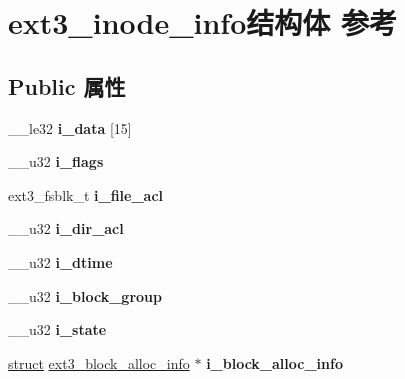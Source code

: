 \hypertarget{structext3__inode__info}{}\section{ext3\+\_\+inode\+\_\+info结构体 参考}
\label{structext3__inode__info}
\subsection*{Public 属性}
\begin{DoxyCompactItemize}
\item 
\mbox{\label{structext3__inode__info_a874b2de262f88993a49367ce4b3f1a1d}} 
\+\_\+\+\_\+le32 {\bfseries i\+\_\+data} \mbox{[}15\mbox{]}
\item 
\mbox{\label{structext3__inode__info_a2373d01f1f3c9dbc4b8bfe3b1b906a39}} 
\+\_\+\+\_\+u32 {\bfseries i\+\_\+flags}
\item 
\mbox{\label{structext3__inode__info_a9a3aec7576ca56da7dd3849a01e5adb4}} 
ext3\+\_\+fsblk\+\_\+t {\bfseries i\+\_\+file\+\_\+acl}
\item 
\mbox{\label{structext3__inode__info_a0224d4275a2f62814abf834895e5c775}} 
\+\_\+\+\_\+u32 {\bfseries i\+\_\+dir\+\_\+acl}
\item 
\mbox{\label{structext3__inode__info_aaacfa15617e193a030bc521b4908af4d}} 
\+\_\+\+\_\+u32 {\bfseries i\+\_\+dtime}
\item 
\mbox{\label{structext3__inode__info_a2f076bb0aae6e9b55a017b0ee25394e0}} 
\+\_\+\+\_\+u32 {\bfseries i\+\_\+block\+\_\+group}
\item 
\mbox{\label{structext3__inode__info_a4f4cd428d0796e56ff2d17409f246e4a}} 
\+\_\+\+\_\+u32 {\bfseries i\+\_\+state}
\item 
\mbox{\label{structext3__inode__info_a656494e2661091efe7fceb9f21bb1908}} 
\hyperlink{interfacestruct}{struct} \hyperlink{structext3__block__alloc__info}{ext3\+\_\+block\+\_\+alloc\+\_\+info} $\ast$ {\bfseries i\+\_\+block\+\_\+alloc\+\_\+info}

\end{DoxyCompactItemize}
